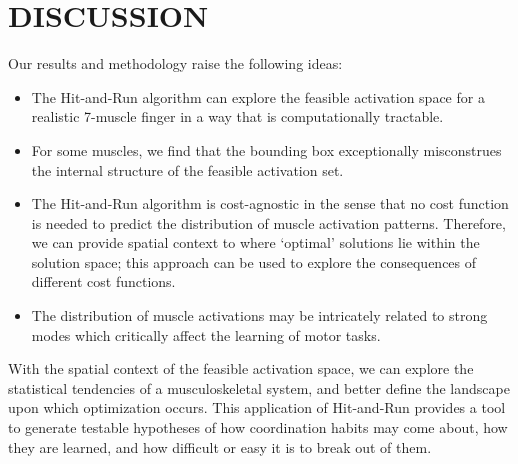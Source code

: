 \section{DISCUSSION}

Our results and methodology raise the following ideas:\\
{\begin{itemize}
	\item The Hit-and-Run algorithm can explore the feasible activation space for a realistic 7-muscle finger in a way that is computationally tractable.
	\item For some muscles, we find that the bounding box exceptionally misconstrues the internal structure of the feasible activation set.
	\item The Hit-and-Run algorithm is cost-agnostic in the sense that no cost function is needed to predict the distribution of muscle activation patterns. Therefore, we can provide spatial context to where `optimal' solutions lie within the solution space; this approach can be used to explore the consequences of different cost functions.
	\item The distribution of muscle activations may be intricately related to strong modes which critically affect the learning of motor tasks.
\end{itemize}}
With the spatial context of the feasible activation space, we can explore the statistical tendencies of a musculoskeletal system, and better define the landscape upon which optimization occurs. This application of Hit-and-Run provides a tool to generate testable hypotheses of how coordination habits may come about, how they are learned, and how difficult or easy it is to break out of them. 




